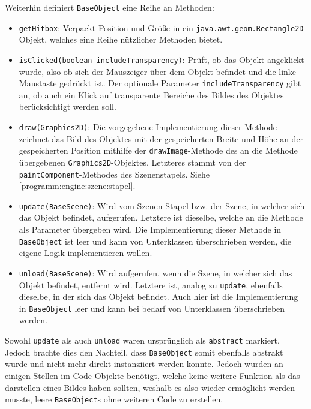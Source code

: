 \begin{sloppypar}
Weiterhin definiert \texttt{BaseObject} eine Reihe an
Methoden:

\begin{itemize}
	\item \texttt{getHitbox}: Verpackt Position und Größe in ein
	      \texttt{java.awt.geom.Rectangle2D}-Objekt, welches eine
	      Reihe nützlicher Methoden bietet.
	\item \texttt{isClicked(boolean includeTransparency)}: Prüft,
	      ob das Objekt angeklickt wurde, also ob sich der Mauszeiger
	      über dem Objekt befindet und die linke Maustaste gedrückt
	      ist. Der optionale Parameter \texttt{includeTransparency}
	      gibt an, ob auch ein Klick auf transparente Bereiche
	      des Bildes des Objektes berücksichtigt werden soll.
	\item \texttt{draw(Graphics2D)}: Die vorgegebene Implementierung
	      dieser Methode zeichnet das Bild des Objektes mit der
	      gespeicherten Breite und Höhe an der gespeicherten Position
	      mithilfe der \texttt{drawImage}-Methode des an die Methode
	      übergebenen \texttt{Graphics2D}-Objektes. Letzteres stammt
	      von der \texttt{paintComponent}-Methodes des Szenenstapels.
	      Siehe \ref{programm:engine:szene:stapel}.
	\item \texttt{update(BaseScene)}: Wird vom Szenen-Stapel bzw.
	      der Szene, in welcher sich das Objekt befindet, aufgerufen.
	      Letztere ist dieselbe, welche an die Methode als Parameter
	      übergeben wird. Die Implementierung dieser Methode in
	      \texttt{BaseObject} ist leer und kann von Unterklassen
	      überschrieben werden, die eigene Logik implementieren wollen.
	\item \texttt{unload(BaseScene)}: Wird aufgerufen, wenn die Szene,
	      in welcher sich das Objekt befindet, entfernt wird. Letztere
	      ist, analog zu \texttt{update}, ebenfalls dieselbe, in der
	      sich das Objekt befindet. Auch hier ist die Implementierung in
	      \texttt{BaseObject} leer und kann bei bedarf von Unterklassen
	      überschrieben werden.
\end{itemize}

Sowohl \texttt{update} als auch \texttt{unload} waren ursprünglich als
\texttt{abstract} markiert. Jedoch brachte dies den Nachteil, dass
\texttt{BaseObject} somit ebenfalls abstrakt wurde und nicht
mehr direkt instanziiert werden konnte. Jedoch wurden an einigen
Stellen im Code Objekte benötigt, welche keine weitere Funktion als
das darstellen eines Bildes haben sollten, weshalb es also wieder
ermöglicht werden musste, \glqq{}leere\grqq{} \texttt{BaseObject}s
ohne weiteren Code zu erstellen.



\end{sloppypar}
